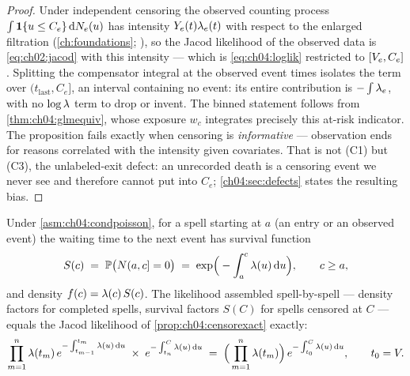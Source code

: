 \begin{proof}
Under independent censoring the observed counting process $\int
\mathbf{1}\{u \le C_e\} \,\mathrm{d} N_e(u)$ has intensity $Y_e(t)\lambda_e(t)$ with
respect to the enlarged filtration (\cref{ch:foundations};
\citealp[III.2]{abgk1993}), so the Jacod likelihood of the observed data
is \cref{eq:ch02:jacod} with this intensity --- which is
\cref{eq:ch04:loglik} restricted to $[V_e, C_e]$. Splitting the
compensator integral at the observed event times isolates the term over
$(t_{\mathrm{last}}, C_e]$, an interval containing no event: its entire
contribution is $-\int \lambda_e$, with no $\log\lambda$ term to drop or
invent. The binned statement follows from \cref{thm:ch04:glmequiv}, whose
exposure $w_c$ integrates precisely this at-risk indicator. The
proposition fails exactly when censoring is \emph{informative} ---
observation ends for reasons correlated with the intensity given
covariates. That is not (C1) but (C3), the unlabeled-exit defect: an
unrecorded death is a censoring event we never see and therefore cannot
put into $C_e$; \cref{ch04:sec:defects} states the resulting bias.
\end{proof}

\begin{proposition}\label{prop:ch04:renewal}
Under \cref{asm:ch04:condpoisson}, for a spell starting at $a$ (an entry
or an observed event) the waiting time to the next event has survival
function
\begin{equation}\label{eq:ch04:survival}
S(c) \;=\; \mathbb{P}\big(N(a, c] = 0\big)
 \;=\; \exp\!\Big(-\int_a^{c} \lambda(u)\,\mathrm{d} u\Big),
 \qquad c \ge a,
\end{equation}
and density $f(c) = \lambda(c)\, S(c)$. The likelihood assembled
spell-by-spell --- density factors for completed spells, survival factors
$S(C)$ for spells censored at $C$ --- equals the Jacod likelihood of
\cref{prop:ch04:censorexact} exactly:
\[
\prod_{m=1}^{n} \lambda(t_m)\,
 e^{-\int_{t_{m-1}}^{t_m} \lambda(u)\,\mathrm{d} u}
 \;\times\;
 e^{-\int_{t_n}^{C} \lambda(u)\,\mathrm{d} u}
 \;=\;
 \Big(\prod_{m=1}^{n} \lambda(t_m)\Big)\,
 e^{-\int_{t_0}^{C} \lambda(u)\,\mathrm{d} u},
\qquad t_0 = V .
\]
\end{proposition}

